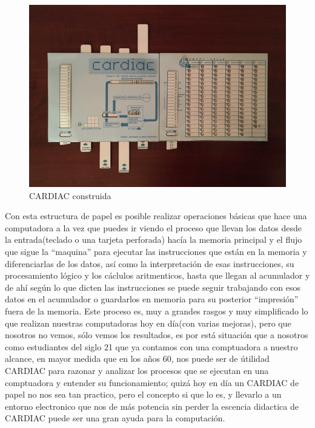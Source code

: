 \documentclass[letterpaper,12pt,oneside]{book}
\begin{document}
		\begin{figure}[h]
			\includegraphics[scale=0.3]{media/CARDIAC_Paper/Construida.jpg}
			\caption{CARDIAC construida}
			\label{fig:CARDIAC_Construida}
		\end{figure}
		
		
		Con esta estructura de papel es posible realizar operaciones básicas que hace una computadora a la vez que puedes ir viendo el proceso que llevan
		los datos desde la entrada(teclado o una tarjeta perforada) hacía la memoria principal y el flujo que sigue la ``maquina'' para ejecutar
		las instrucciones que están en la memoria y diferenciarlas de los datos, así como la interpretación de esas instrucciones, su procesamiento lógico y los
		cáclulos aritmenticos, hasta que llegan al acumulador y de ahí según lo que dicten las instrucciones se puede seguir trabajando con
		esos datos en el acumulador o guardarlos en memoria para su posterior ``impresión'' fuera de la memoria. Este proceso es, muy a grandes rasgos y muy simplificado
		lo que realizan nuestras computadoras hoy en día(con varias mejoras), pero que nosotros no vemos, sólo vemos los resultados, es por está situación que a nosotros
		como estudiantes del siglo 21 que ya contamos con una comptuadora a nuestro alcance, en mayor medida que en los años 60, nos puede ser de útilidad
		CARDIAC para razonar y analizar los procesos que se ejecutan en una comptuadora y entender su funcionamiento; quizá hoy en día un CARDIAC de papel
		no nos sea tan practico, pero el concepto si que lo es, y llevarlo a un entorno electronico que nos de más potencia sin perder la escencia didactica
		de CARDIAC puede ser una gran ayuda para la computación.
\end{document}
